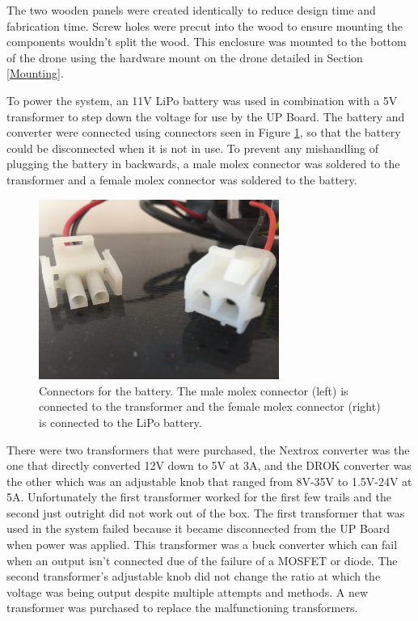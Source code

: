 The two wooden panels were created identically to reduce design time and fabrication time. Screw holes were precut into the wood to ensure mounting the components wouldn't split the wood. This enclosure was mounted to the bottom of the drone using the hardware mount on the drone detailed in Section \ref{Mounting}. \par

To power the system, an 11V LiPo battery was used in combination with a 5V transformer to step down the voltage for use by the UP Board. The battery and converter were connected using connectors seen in Figure \ref{fig:connectors}, so that the battery could be disconnected when it is not in use. To prevent any mishandling of plugging the battery in backwards, a male molex connector was soldered to the transformer and a female molex connector was soldered to the battery.
\begin{figure}[ht!]
	\centering
	\includegraphics[width=0.70\textwidth]{img/connectors.JPG}
	\caption{Connectors for the battery. The male molex connector (left) is connected to the transformer and the female molex connector (right) is connected to the LiPo battery.}
	\label{fig:connectors}
\end{figure}\par
There were two transformers that were purchased, the Nextrox converter was the one that directly converted 12V down to 5V at 3A, and the DROK converter was the other which was an adjustable knob that ranged from 8V-35V to 1.5V-24V at 5A. Unfortunately the first transformer worked for the first few trails and the second just outright did not work out of the box. The first transformer that was used in the system failed because it became disconnected from the UP Board when power was applied. This transformer was a buck converter which can fail when an output isn't connected due of the failure of a MOSFET or diode. The second transformer's adjustable knob did not change the ratio at which the voltage was being output despite multiple attempts and methods. A new transformer was purchased to replace the malfunctioning transformers. \par

